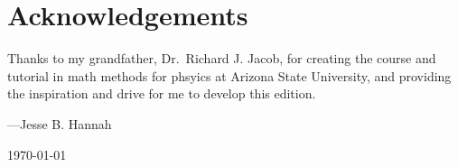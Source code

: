 \chapter{Acknowledgements}

Thanks to my grandfather, Dr.\ Richard J. Jacob, for creating the course and
tutorial in math methods for phsyics at Arizona State University, and providing
the inspiration and drive for me to develop this edition.

\begin{flushright}
---Jesse B. Hannah

\today
\end{flushright}
